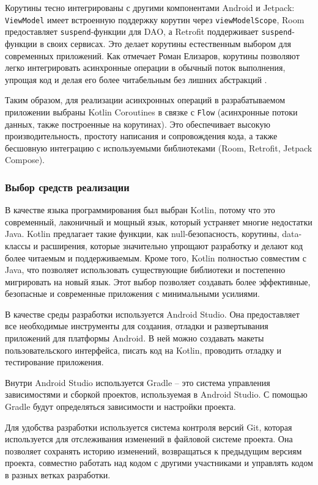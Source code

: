 Корутины тесно интегрированы с другими компонентами Android и Jetpack: \texttt{ViewModel} имеет встроенную поддержку корутин через \texttt{viewModelScope}, Room предоставляет \texttt{suspend}-функции для DAO, а Retrofit поддерживает \texttt{suspend}-функции в своих сервисах. Это делает корутины естественным выбором для современных приложений. Как отмечает Роман Елизаров, корутины позволяют легко интегрировать асинхронные операции в обычный поток выполнения, упрощая код и делая его более читабельным без лишних абстракций \cite{refn}.

Таким образом, для реализации асинхронных операций в разрабатываемом приложении выбраны Kotlin Coroutines в связке с \texttt{Flow} (асинхронные потоки данных, также построенные на корутинах). Это обеспечивает высокую производительность, простоту написания и сопровождения кода, а также бесшовную интеграцию с используемыми библиотеками (Room, Retrofit, Jetpack Compose).

\subsubsection{Выбор средств реализации}

В качестве языка программирования был выбран Kotlin, потому что это современный, лаконичный и мощный язык, который устраняет многие недостатки Java. Kotlin предлагает такие функции, как null-безопасность, корутины, data-классы и расширения, которые значительно упрощают разработку и делают код более читаемым и поддерживаемым. Кроме того, Kotlin полностью совместим с Java, что позволяет использовать существующие библиотеки и постепенно мигрировать на новый язык. Этот выбор позволяет создавать более эффективные, безопасные и современные приложения с минимальными усилиями.

В качестве среды разработки используется Android Studio. Она предоставляет все необходимые инструменты для создания, отладки и развертывания приложений для платформы Android. В ней можно создавать макеты пользовательского интерфейса, писать код на Kotlin, проводить отладку и тестирование приложения. \cite{refg}

Внутри Android Studio используется Gradle – это система управления зависимостями и сборкой проектов, используемая в Android Studio. С помощью Gradle будут определяться зависимости и настройки проекта.

Для удобства разработки используется система контроля версий Git, которая используется для отслеживания изменений в файловой системе проекта. Она позволяет сохранять историю изменений, возвращаться к предыдущим версиям проекта, совместно работать над кодом с другими участниками и управлять кодом в разных ветках разработки. \cite{refg}

